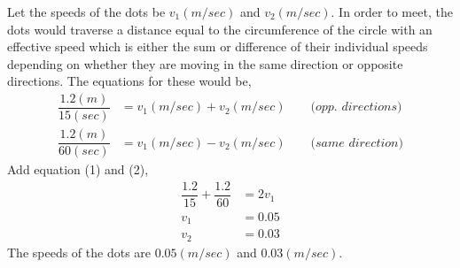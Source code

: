 \begin{solution}
  Let the speeds of the dots be $v_1(m/sec)$ and $v_2(m/sec)$. In order to meet, the dots would traverse a distance equal to the circumference of the circle with an effective speed which is either the sum or difference of their individual speeds depending on whether they are moving in the same direction or opposite directions. The equations for these would be,
  \begin{align}
    \dfrac{1.2(m)}{15(sec)} &= v_1(m/sec)+v_2(m/sec) 
	\quad\quad\textit{(opp. directions)} \\
    \dfrac{1.2(m)}{60(sec)} &= v_1(m/sec)-v_2(m/sec) 
	\quad\quad\textit{(same direction)}
  \end{align}
  Add equation (1) and (2), 
  \begin{align}
    \dfrac{1.2}{15}+\dfrac{1.2}{60} &= 2v_1 \\
    v_1                             &= 0.05 \\
    v_2                             &= 0.03
  \end{align}
  The speeds of the dots are $0.05(m/sec)$ and $0.03(m/sec)$.
\end{solution}

